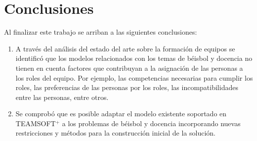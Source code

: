 \chapter*{Conclusiones}
Al finalizar este trabajo se arriban a las siguientes conclusiones:
\begin{enumerate}
	\item A través del análisis del estado del arte sobre la formación de equipos se identificó que los modelos relacionados con los temas de béisbol y docencia no tienen en cuenta factores que contribuyan a la asignación de las personas a los roles del equipo. Por ejemplo, las competencias necesarias para cumplir los roles, las preferencias de las personas por los roles, las incompatibilidades entre las personas, entre otros.
	\item Se comprobó que es posible adaptar el modelo existente soportado en TEAMSOFT$^+$ a los problemas de béisbol y docencia incorporando nuevas restricciones y métodos para la construcción inicial de la solución.
\end{enumerate}